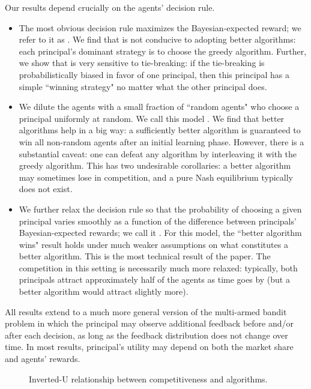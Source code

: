 Our results depend crucially on the agents' decision rule. 
\begin{itemize}

\item The most obvious decision rule maximizes the Bayesian-expected reward; we refer to it as \HardMax. We find that \HardMax is not conducive to adopting better algorithms: each principal's dominant strategy is to choose the greedy algorithm. Further, we show that \HardMax is very sensitive to tie-breaking: if the tie-breaking is probabilistically biased in favor of one principal, then this principal has a simple ``winning strategy" no matter what the other principal does.

\item We dilute the \HardMax agents with a small fraction of ``random agents" who choose a principal uniformly at random. We call this model \HardMaxRandom. We find that better algorithms help in a big way: a sufficiently better algorithm is guaranteed to win all non-random agents after an initial learning phase. However, there is a substantial caveat: one can defeat any algorithm by interleaving it with the greedy algorithm. This has two undesirable corollaries: a better algorithm may sometimes lose in competition, and a pure Nash equilibrium typically does not exist.

\item We further relax the decision rule so that the probability of choosing a given principal varies smoothly as a function of the difference between  principals' Bayesian-expected rewards; we call it \SoftMaxRandom. For this model, the ``better algorithm wins" result holds under much weaker assumptions on what constitutes a better algorithm. This is the most technical result of the paper. The competition in this setting is necessarily much more relaxed: typically, both principals attract approximately half of the agents as time goes by (but a better algorithm would attract slightly more).
\end{itemize}

All results extend to a much more general version of the multi-armed bandit problem in which the principal may observe additional feedback before and/or after each decision, as long as the feedback distribution does not change over time. In most results, principal's utility may depend on both the market share and agents' rewards.

\begin{figure}
\begin{center}

\caption{Inverted-U relationship between competitiveness and algorithms.}
\label{fig:inverted-U}
\end{center}
\end{figure}


